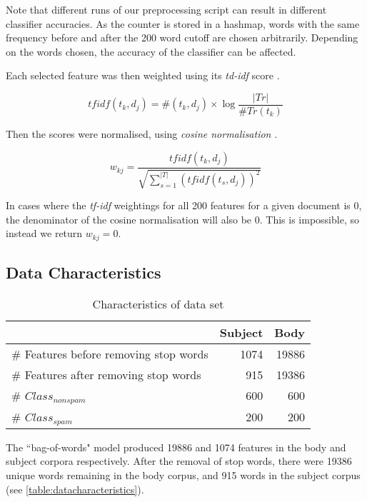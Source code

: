 \documentclass[10pt, a4paper]{article}
\begin{document}
Note that different runs of our preprocessing script can result in different classifier accuracies. As the counter is stored in a hashmap, words with the same frequency before and after the 200 word cutoff are chosen arbitrarily. Depending on the words chosen, the accuracy of the classifier can be affected.

Each selected feature was then weighted using its \emph{td-idf} score \cite{sebastiani}.

$$ tfidf(t_k, d_j) = \#(t_k, d_j) \times \log \frac{|Tr|}{\#Tr(t_k)} $$

Then the scores were normalised, using \emph{cosine normalisation} \cite{sebastiani}.

$$ w_{kj} = \frac{tfidf(t_k, d_j)}{\sqrt{\sum_{s=1}^{|T|} (tfidf(t_s, d_j))^2 }} $$

In cases where the \textit{tf-idf} weightings for all 200 features for a given document is 0, the denominator of the cosine normalisation will also be 0. This is impossible, so instead we return $w_{kj} = 0$.

\subsection{Data Characteristics}

\setlength\extrarowheight{3pt}

\begin{table}[H]
\centering
\caption{Characteristics of data set}
\begin{tabular}{@{}lrr@{}}
\toprule
& \textbf{Subject} & \textbf{Body} \\
\midrule
\# Features before removing stop words & 1074 & 19886 \\
\# Features after removing stop words & 915 & 19386 \\
\# $Class_{nonspam}$ & 600 & 600 \\
\# $Class_{spam}$ & 200 & 200 \\
\bottomrule
\end{tabular}
\label{table:datacharacteristics}
\end{table}

The ``bag-of-words" model produced 19886 and 1074 features in the body and subject corpora respectively. After the removal of stop words, there were 19386 unique words remaining in the body corpus, and 915 words in the subject corpus (see \autoref{table:datacharacteristics}).
\end{document}
